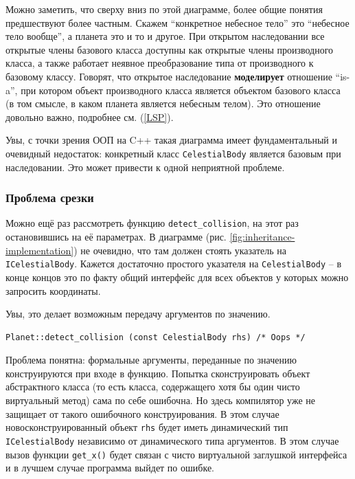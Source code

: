 \documentclass[a4paper,12pt,oneside]{article}
\begin{document}
Можно заметить, что сверху вниз по этой диаграмме, более общие понятия предшествуют более частным. Скажем ``конкретное небесное тело'' это ``небесное тело вообще'', а планета это и то и другое. При открытом наследовании все открытые члены базового класса доступны как открытые члены производного класса, а также работает неявное преобразование типа от производного к базовому классу. Говорят, что открытое наследование \textbf{моделирует} отношение ``is-a'', при котором объект производного класса является объектом базового класса (в том смысле, в каком планета является небесным телом). Это отношение довольно важно, подробнее см. (\ref{LSP}).

Увы, с точки зрения ООП на C++ такая диаграмма имеет фундаментальный и очевидный недостаток: конкретный класс \lstinline!CelestialBody! является базовым при наследовании. Это может привести к одной неприятной проблеме.

\subsubsection{Проблема срезки}\label{Cutting}

Можно ещё раз рассмотреть функцию \lstinline!detect_collision!, на этот раз остановившись на её параметрах. В диаграмме (рис. \ref{fig:inheritance-implementation}) не очевидно, что там должен стоять указатель на \lstinline!ICelestialBody!. Кажется достаточно простого указателя на \lstinline!CelestialBody! -- в конце концов это по факту общий интерфейс для всех объектов у которых можно запросить координаты.

Увы, это делает возможным передачу аргументов по значению.

\begin{lstlisting}
Planet::detect_collision (const CelestialBody rhs) /* Oops */
\end{lstlisting}

Проблема понятна: формальные аргументы, переданные по значению конструируются при входе в функцию. Попытка сконструировать объект абстрактного класса (то есть класса, содержащего хотя бы один чисто виртуальный метод) сама по себе ошибочна. Но здесь компилятор уже не защищает от такого ошибочного конструирования. В этом случае новосконструированный объект \lstinline!rhs! будет иметь динамический тип \lstinline!ICelestialBody! независимо от динамического типа аргументов. В этом случае вызов функции \lstinline!get_x()! будет связан с чисто виртуальной заглушкой интерфейса и в лучшем случае программа выйдет по ошибке. 
\end{document}
